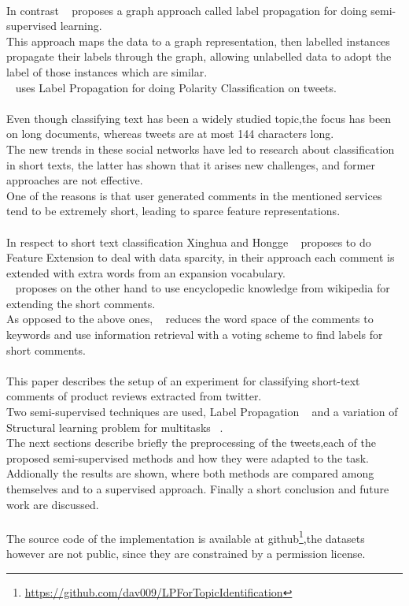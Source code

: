 \documentclass[4pt,a4paper,twocolumn]{article}
\begin{document}
\\
In contrast ~\cite{Zhu:2005:SLG:1104523} proposes a graph approach called label propagation for
doing semi-supervised learning.\\
This approach maps the data to a graph representation, then labelled instances propagate their labels through the graph, allowing unlabelled data to adopt the label of those instances which are similar.\\
~\cite{Speriosu_twitterpolarity} uses Label Propagation for doing Polarity Classification on tweets.\\
\\
Even though classifying text has been a widely studied topic,the focus has been on long documents,
whereas tweets are at most 144 characters long.\\
The new trends in these social networks have led to research about classification in short texts, the latter has  shown that it arises new challenges, and former approaches are not  effective.\\
One of the reasons is that  user generated comments in the mentioned services tend to be extremely short, leading to sparce feature representations.\\
\\
In respect to short text classification Xinghua and Hongge ~\cite{Fan:2010:NMC:1916732.1917677} proposes  to do Feature Extension to deal with data sparcity, in their approach each comment is extended with extra words from an expansion vocabulary.\\
~\cite{Gabrilovich:2006:OBB:1597348.1597395} proposes on the other hand to use encyclopedic knowledge from wikipedia for extending the short comments.\\
As opposed to the above ones,  ~\cite{Sun:2012:STC:2348283.2348511} reduces the word space of the comments to keywords and use information retrieval with a voting scheme to find labels for short comments.\\
\\
This paper describes the setup of an experiment for classifying short-text comments of product reviews extracted from twitter.\\
Two semi-supervised techniques are used, Label Propagation ~\cite{Zhu:2005:SLG:1104523}  and  a variation of Structural learning problem for multitasks ~\cite{Ando:2005:FLP:1046920.1194905}.\\
The next sections describe briefly  the preprocessing of the tweets,each of the proposed semi-supervised methods and how they were adapted to the task. \\
Addionally the results are shown, where both methods are compared among themselves and to a supervised approach.
Finally a short conclusion and future work are discussed.\\
\\
The source code of the implementation is available at github\footnote{\url{https://github.com/dav009/LPForTopicIdentification}},the datasets however are not public, since they are constrained by a permission license.
\end{document}
